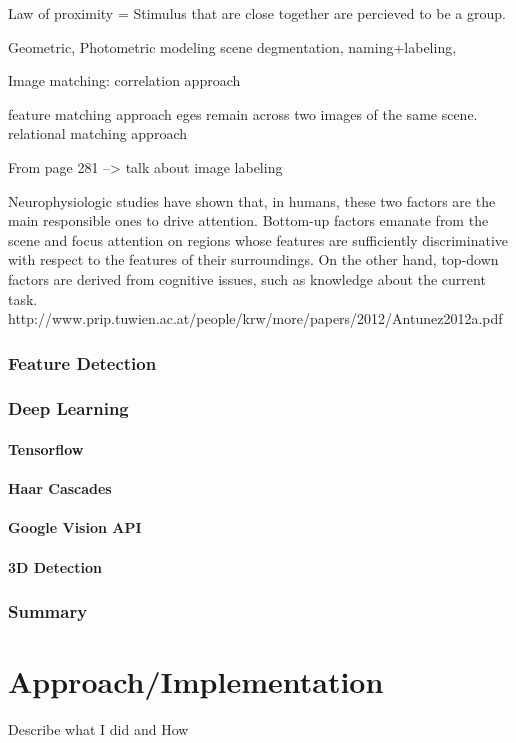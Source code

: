 \documentclass{mproj}
\begin{document}
Law of proximity = Stimulus that are close together are percieved to be a group.

Geometric, Photometric modeling scene degmentation, naming+labeling,

Image matching:
correlation approach
 
feature matching approach
eges remain across two images of the same scene. 
relational matching approach

From page 281 --> talk about image labeling

Neurophysiologic studies have shown that, in humans, these two 
factors are the main responsible ones to drive attention. Bottom-up factors emanate from the scene and 
focus attention on regions whose features are sufficiently discriminative with respect to the features 
of their surroundings. On the other hand, top-down factors are derived from cognitive issues, such as 
knowledge about the current task.
http://www.prip.tuwien.ac.at/people/krw/more/papers/2012/Antunez2012a.pdf


\subsection{Feature Detection}
\subsection{Deep Learning}
\subsubsection{Tensorflow}
\subsubsection{Haar Cascades}
\subsubsection{Google Vision API}
\subsubsection{3D Detection}
\subsection{Summary}





\chapter{Approach/Implementation}
Describe what I did and How
\end{document}
